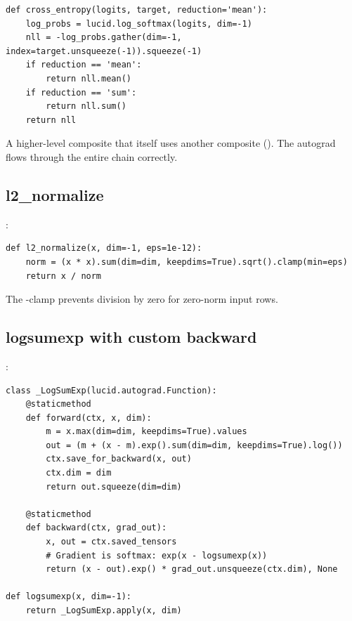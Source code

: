 \begin{lstlisting}[style=lucid,language=LucidPython]
def cross_entropy(logits, target, reduction='mean'):
    log_probs = lucid.log_softmax(logits, dim=-1)
    nll = -log_probs.gather(dim=-1, index=target.unsqueeze(-1)).squeeze(-1)
    if reduction == 'mean':
        return nll.mean()
    if reduction == 'sum':
        return nll.sum()
    return nll
\end{lstlisting}

A higher-level composite that itself uses another composite
(). The autograd flows through the entire chain
correctly.

\subsection{l2\_normalize}
\label{ssec:composite_ops:l2_normalize}

:

\begin{lstlisting}[style=lucid,language=LucidPython]
def l2_normalize(x, dim=-1, eps=1e-12):
    norm = (x * x).sum(dim=dim, keepdims=True).sqrt().clamp(min=eps)
    return x / norm
\end{lstlisting}

The -clamp prevents division by zero for zero-norm input
rows.

\subsection{logsumexp with custom backward}
\label{ssec:composite_ops:logsumexp}

:

\begin{lstlisting}[style=lucid,language=LucidPython]
class _LogSumExp(lucid.autograd.Function):
    @staticmethod
    def forward(ctx, x, dim):
        m = x.max(dim=dim, keepdims=True).values
        out = (m + (x - m).exp().sum(dim=dim, keepdims=True).log())
        ctx.save_for_backward(x, out)
        ctx.dim = dim
        return out.squeeze(dim=dim)

    @staticmethod
    def backward(ctx, grad_out):
        x, out = ctx.saved_tensors
        # Gradient is softmax: exp(x - logsumexp(x))
        return (x - out).exp() * grad_out.unsqueeze(ctx.dim), None

def logsumexp(x, dim=-1):
    return _LogSumExp.apply(x, dim)
\end{lstlisting}

